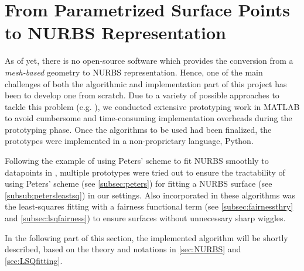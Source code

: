 \section{From Parametrized Surface Points to NURBS Representation}
As of yet, there is no open-source software which provides the conversion from a \textit{mesh-based} geometry to NURBS representation. Hence, one of the main challenges of both the algorithmic and implementation part of this project has been to develop one from scratch. Due to a variety of possible approaches to tackle this problem (e.g. \cite{ eck1996automatic, becker2011advanced}), we conducted extensive prototyping work in MATLAB \cite{MATLAB} to avoid cumbersome and time-consuming implementation overheads during the prototyping phase. Once the algorithms to be used had been finalized, the prototypes were implemented in a non-proprietary language, Python. 

Following the example of using Peters' scheme to fit NURBS smoothly to datapoints in \cite{eck1996automatic}, multiple prototypes were tried out to ensure the tractability of using Peters' scheme (see \autoref{subsec:peters}) for fitting a NURBS surface (see \autoref{subsub:petersleastsq}) in our settings. Also incorporated in these algorithms was the least-squares fitting with a fairness functional term (see \autoref{subsec:fairnessthry} and \autoref{subsec:lsqfairness}) to ensure surfaces without unnecessary sharp wiggles.

In the following part of this section, the implemented algorithm will be shortly described, based on the theory and notations in \autoref{sec:NURBS} and \autoref{sec:LSQfitting}.

